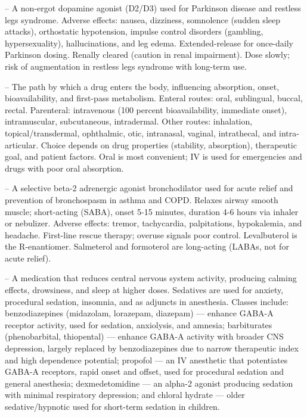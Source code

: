 -- A non-ergot dopamine agonist (D2/D3) used for Parkinson disease and restless legs syndrome. Adverse effects: nausea, dizziness, somnolence (sudden sleep attacks), orthostatic hypotension, impulse control disorders (gambling, hypersexuality), hallucinations, and leg edema. Extended-release for once-daily Parkinson dosing. Renally cleared (caution in renal impairment). Dose slowly; risk of augmentation in restless legs syndrome with long-term use.

-- The path by which a drug enters the body, influencing absorption, onset, bioavailability, and first-pass metabolism. Enteral routes: oral, sublingual, buccal, rectal. Parenteral: intravenous (100 percent bioavailability, immediate onset), intramuscular, subcutaneous, intradermal. Other routes: inhalation, topical/transdermal, ophthalmic, otic, intranasal, vaginal, intrathecal, and intra-articular. Choice depends on drug properties (stability, absorption), therapeutic goal, and patient factors. Oral is most convenient; IV is used for emergencies and drugs with poor oral absorption.

-- A selective beta-2 adrenergic agonist bronchodilator used for acute relief and prevention of bronchospasm in asthma and COPD. Relaxes airway smooth muscle; short-acting (SABA), onset 5-15 minutes, duration 4-6 hours via inhaler or nebulizer. Adverse effects: tremor, tachycardia, palpitations, hypokalemia, and headache. First-line rescue therapy; overuse signals poor control. Levalbuterol is the R-enantiomer. Salmeterol and formoterol are long-acting (LABAs, not for acute relief).

-- A medication that reduces central nervous system activity, producing calming effects, drowsiness, and sleep at higher doses. Sedatives are used for anxiety, procedural sedation, insomnia, and as adjuncts in anesthesia. Classes include: benzodiazepines (midazolam, lorazepam, diazepam) — enhance GABA-A receptor activity, used for sedation, anxiolysis, and amnesia; barbiturates (phenobarbital, thiopental) — enhance GABA-A activity with broader CNS depression, largely replaced by benzodiazepines due to narrow therapeutic index and high dependence potential; propofol — an IV anesthetic that potentiates GABA-A receptors, rapid onset and offset, used for procedural sedation and general anesthesia; dexmedetomidine — an alpha-2 agonist producing sedation with minimal respiratory depression; and chloral hydrate — older sedative/hypnotic used for short-term sedation in children.

